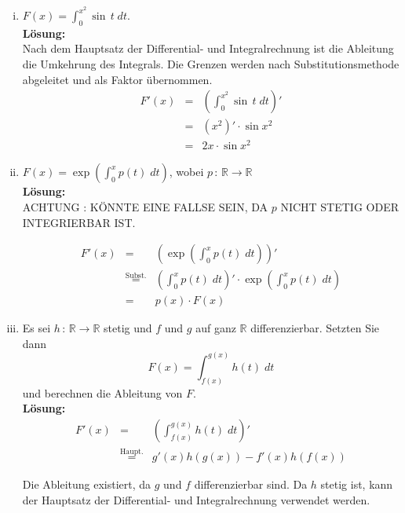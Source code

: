 \documentclass[11pt,a4paper,ngerman]{article}
\begin{document}
\begin{enumerate}[i)]
    \item $F(x) = \int_{0}^{x^2} \sin \, t \; dt$.\\

\textbf{Lösung:}\\

Nach dem Hauptsatz der Differential- und Integralrechnung ist die Ableitung die Umkehrung des Integrals. Die Grenzen werden nach Substitutionsmethode abgeleitet und als Faktor übernommen.
$$
\begin{array}{rcl}
F'(x)	&=& \left( \int_0^{x^2} \sin \, t \; dt\right)'\\
	&=& (x^2)' \cdot \sin x^2\\
	&=& 2x \cdot \sin x^2
\end{array}
$$

    
    \item $F(x) = \exp \left( \int_{0}^{x} p(t)\; dt\right)$, wobei $p \, : \, \mathbb{R} \rightarrow \mathbb{R}$\\

\textbf{Lösung:}\\

ACHTUNG : KÖNNTE EINE FALLSE SEIN, DA $p$ NICHT STETIG ODER INTEGRIERBAR IST.

$$
\begin{array}{rcl}
F'(x)	&=& \left( \exp \left( \int_0^x p(t) \; dt \right) \right)'\\
	&\stackrel{\text{Subst.}}{=}& \left( \int_0^x p(t) \; dt\right)' \cdot \exp \left( \int_0^x p(t) \; dt\right)\\
	&=& p(x) \cdot F(x)
\end{array}
$$

    \item Es sei $h \, : \, \mathbb{R} \rightarrow \mathbb{R}$ stetig und $f$ und $g$ auf ganz $\mathbb{R}$ differenzierbar. Setzten Sie dann
$$
    F(x) = \int_{f(x)}^{g(x)} h(t) \; dt
$$
und berechnen die Ableitung von $F$.\\

\textbf{Lösung:}\\

$$
\begin{array}{rcl}
F'(x)	&=& \left( \int_{f(x)}^{g(x)} h(t) \; dt \right)'\\
	&\stackrel{\text{Haupt.}}{=}& g'(x) h(g(x)) - f'(x) h (f(x))
\end{array}
$$

Die Ableitung existiert, da $g$ und $f$ differenzierbar sind. Da $h$ stetig ist, kann der Hauptsatz der Differential- und Integralrechnung verwendet werden.

\end{enumerate}
\end{document}
